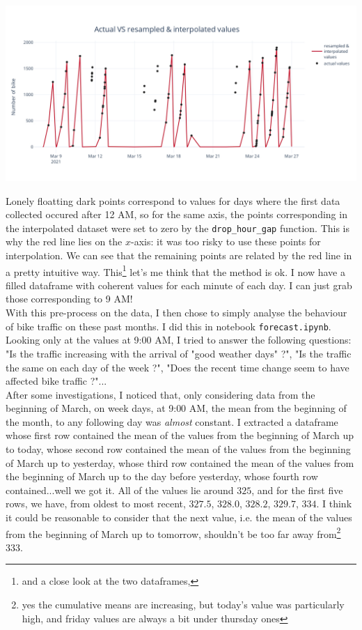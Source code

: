 \documentclass[11pt,a4paper]{article}
\begin{document}
\begin{center}
\includegraphics[scale=0.35]{resamp_interp.jpg} 
\end{center}


Lonely floatting dark points correspond to values for days where the first data collected occured after 12 AM, so for the same axis, the points corresponding in the interpolated dataset were set to zero by the \texttt{drop\_hour\_gap} function. This is why the red line lies on the $x$-axis: it was too risky to use these points for interpolation. We can see that the remaining points are related by the red line in a pretty intuitive way. This\footnote{and a close look at the two dataframes,} let's me think that the method is ok. I now have a filled dataframe with coherent values for each minute of each day. I can just grab those corresponding to 9 AM!\\

With this pre-process on the data, I then chose to simply analyse the behaviour of bike traffic on these past months. I did this in notebook \texttt{forecast.ipynb}. Looking only at the values at 9:00 AM, I tried to answer the following questions: "Is the traffic increasing with the arrival of "good weather days" ?", "Is the traffic the same on each day of the week ?", "Does the recent time change seem to have affected bike traffic ?"...\\

After some investigations, I noticed that, only considering data from the beginning of March, on week days, at 9:00 AM, the mean from the beginning of the month, to any following day was \textit{almost} constant. I extracted a dataframe whose first row contained the mean of the values from the beginning of March up to today, whose second row contained the mean of the values from the beginning of March up to yesterday, whose third row contained the mean of the values from the beginning of March up to the day before yesterday, whose fourth row contained...well we got it. All of the values lie around $325$, and for the first five rows, we have, from oldest to most recent, $327.5$, $328.0$, $328.2$, $329.7$, $334$. I think it could be reasonable to consider that the next value, i.e. the mean of the values from the beginning of March up to tomorrow, shouldn't be too far away from\footnote{yes the cumulative means are increasing, but today's value was particularly high, and friday values are always a bit under thursday ones} $333$.
\end{document}
